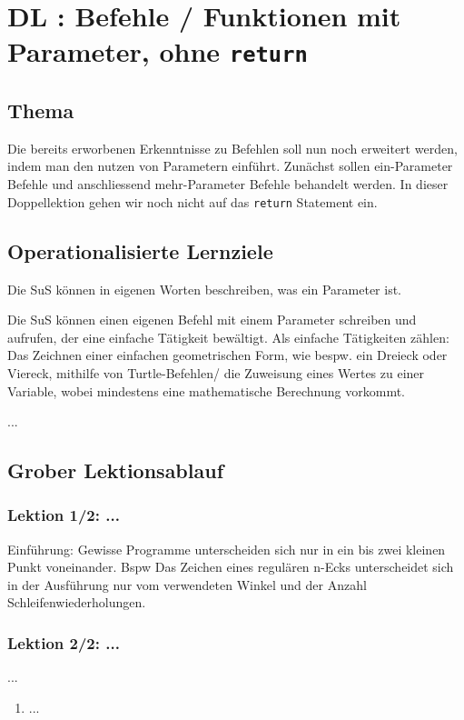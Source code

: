 \section{DL \themycounter: Befehle / Funktionen mit Parameter, ohne \texorpdfstring{\lstinline|return|}{return}}
\begin{myExBox}[title=DL \themycounter]
\subsection*{Thema}
Die bereits erworbenen Erkenntnisse zu Befehlen soll nun noch erweitert werden, indem man den nutzen von Parametern einführt. Zunächst sollen ein-Parameter Befehle und anschliessend mehr-Parameter Befehle behandelt werden. In dieser Doppellektion gehen wir noch nicht auf das \lstinline|return| Statement ein. 


\subsection*{Operationalisierte Lernziele}
\begin{todolist}
    \item Die SuS können in eigenen Worten beschreiben, was ein Parameter ist.
    \item Die SuS können einen eigenen Befehl mit einem Parameter schreiben und aufrufen, der eine einfache Tätigkeit bewältigt. Als einfache Tätigkeiten zählen: Das Zeichnen einer einfachen geometrischen Form, wie bespw. ein Dreieck oder Viereck, mithilfe von Turtle-Befehlen/ die Zuweisung eines Wertes zu einer Variable, wobei mindestens eine mathematische Berechnung vorkommt.
    \item ...
\end{todolist}

\subsection*{Grober Lektionsablauf}
\subsubsection*{Lektion 1/2: ...}
Einführung: Gewisse Programme unterscheiden sich nur in ein bis zwei kleinen Punkt voneinander. Bspw Das Zeichen eines regulären n-Ecks unterscheidet sich in der Ausführung nur vom verwendeten Winkel und der Anzahl Schleifenwiederholungen.

\subsubsection*{Lektion 2/2: ...}
...

\begin{myExBox}[title=Mögliche Schwierigkeiten \& geeignete Massnahmen]
\begin{enumerate}
    \item ...
\end{enumerate}
\end{myExBox}
\end{myExBox}
\newpage{}


